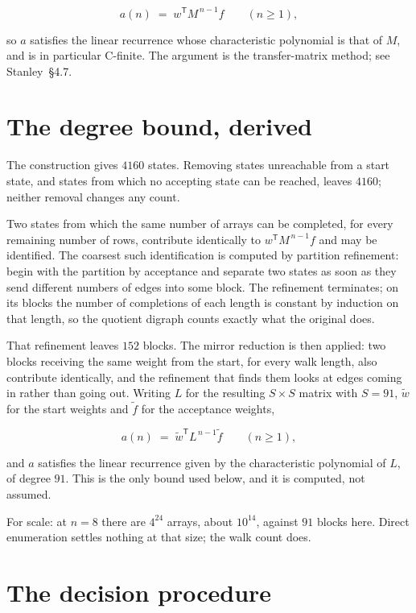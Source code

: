 \documentclass[11pt]{article}
\theoremstyle{definition}
\begin{document}
\[a(n) \;=\; w^{\mathsf T} M^{\,n-1} f \qquad (n \ge 1),\]

so $a$ satisfies the linear recurrence whose characteristic polynomial is that of $M$, and is in particular C-finite. The argument is the transfer-matrix method; see Stanley~\S4.7.

\section{The degree bound, derived}

The construction gives $4160$ states. Removing states unreachable from a start state, and states from which no accepting state can be reached, leaves $4160$; neither removal changes any count.

Two states from which the same number of arrays can be completed, for every remaining number of rows, contribute identically to $w^{\mathsf T}M^{\,n-1}f$ and may be identified. The coarsest such identification is computed by partition refinement: begin with the partition by acceptance and separate two states as soon as they send different numbers of edges into some block. The refinement terminates; on its blocks the number of completions of each length is constant by induction on that length, so the quotient digraph counts exactly what the original does.

That refinement leaves $152$ blocks. The mirror reduction is then applied: two blocks receiving the same weight from the start, for every walk length, also contribute identically, and the refinement that finds them looks at edges coming in rather than going out. Writing $L$ for the resulting $S \times S$ matrix with $S = 91$, $\tilde w$ for the start weights and $\tilde f$ for the acceptance weights,

\[a(n) \;=\; \tilde w^{\mathsf T} L^{\,n-1} \tilde f \qquad (n \ge 1),\]

and $a$ satisfies the linear recurrence given by the characteristic polynomial of $L$, of degree $91$. This is the only bound used below, and it is computed, not assumed.

For scale: at $n = 8$ there are $4^{24}$ arrays, about $10^{14}$, against $91$ blocks here. Direct enumeration settles nothing at that size; the walk count does.

\section{The decision procedure}
\end{document}
